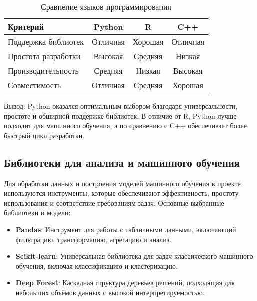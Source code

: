 \begin{table}[htbp]
	\centering
	\caption{Сравнение языков программирования}
	\label{tab:languages}
	\begin{tabular}{|l|c|c|c|}
		\hline
		\textbf{Критерий} & \textbf{Python} & \textbf{R} & \textbf{C++} \\
		\hline
		Поддержка библиотек & Отличная & Хорошая & Отличная \\
		Простота разработки & Высокая & Средняя & Низкая \\
		Производительность & Средняя & Низкая & Высокая \\
		Совместимость & Отличная & Средняя & Хорошая \\
		\hline
	\end{tabular}
\end{table}

Вывод: Python оказался оптимальным выбором благодаря универсальности, простоте и обширной поддержке библиотек. В отличие от R, Python лучше подходит для машинного обучения, а по сравнению с C++ обеспечивает более быстрый цикл разработки.

\subsection{Библиотеки для анализа и машинного обучения}
Для обработки данных и построения моделей машинного обучения в проекте используются инструменты, которые обеспечивают эффективность, простоту использования и соответствие требованиям задач. Основные выбранные библиотеки и модели:
\begin{itemize}
	\item \textbf{Pandas}: Инструмент для работы с табличными данными, включающий фильтрацию, трансформацию, агрегацию и анализ.
	\item \textbf{Scikit-learn}: Универсальная библиотека для задач классического машинного обучения, включая классификацию и кластеризацию.
	\item \textbf{Deep Forest}: Каскадная структура деревьев решений, подходящая для небольших объёмов данных с высокой интерпретируемостью.
\end{itemize}

